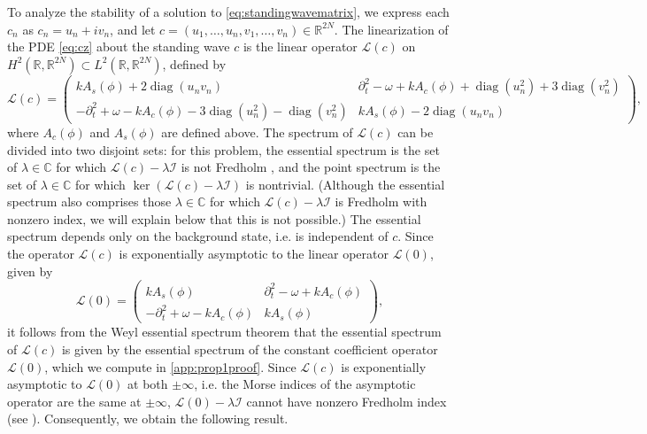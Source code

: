 \documentclass[11pt,reqno]{amsart}
\def\R{{\mathbb R}}
\def\C{{\mathbb C}}
\def\calI{{\mathcal I}}
\def\calL{{\mathcal L}}
\DeclareMathOperator{\diag}{diag}
\begin{document}
To analyze the stability of a solution to \cref{eq:standingwavematrix}, we express each $c_n$ as $c_n = u_n + i v_n$, and let $c = (u_1, \dots, u_n,v_1, \dots, v_n) \in \R^{2N}$. The linearization of the PDE \cref{eq:cz} about the standing wave $c$ is the linear operator $\calL(c)$ on $H^2(\R, \R^{2N}) \subset L^2(\R, \R^{2N})$, defined by 
\begin{equation}\label{eq:linc}
\calL(c) = \begin{pmatrix}
k A_s(\phi) + 2 \diag(u_n v_n) & \partial_t^2 - \omega + k A_c(\phi) + \diag(u_n^2) + 3 \diag(v_n^2) \\
-\partial_t^2 + \omega - k A_c(\phi) - 3\diag(u_n^2) - \diag(v_n^2) &
k A_s(\phi) - 2 \diag(u_n v_n)
\end{pmatrix},
\end{equation}
where $A_c(\phi)$ and $A_s(\phi)$ are defined above. The spectrum of $\calL(c) $ can be divided into two disjoint sets: for this problem, the essential spectrum is the set of $\lambda \in \C$ for which $\calL(c) - \lambda \calI$ is not Fredholm \cite[Section 3.1]{Kapitula2013}, and the point spectrum is the set of $\lambda \in \C$ for which $\ker( \calL(c) - \lambda \calI)$ is nontrivial. (Although the essential spectrum also comprises those $\lambda \in \C$ for which $\calL(c) - \lambda \calI$ is Fredholm with nonzero index, we will explain below that this is not possible.) The essential spectrum depends only on the background state, i.e. is independent of $c$. Since the operator $\calL(c)$ is exponentially asymptotic to the linear operator $\calL(0)$, given by
\begin{equation}\label{eq:L0}
\calL(0) = \begin{pmatrix}
k A_s(\phi) & \partial_t^2 - \omega + k A_c(\phi)  \\
-\partial_t^2 + \omega - k A_c(\phi) &
k A_s(\phi) 
\end{pmatrix},
\end{equation}
it follows from the Weyl essential spectrum theorem \cite[Theorem 2.2.6]{Kapitula2013} that the essential spectrum of $\calL(c)$ is given by the essential spectrum of the constant coefficient operator $\calL(0)$, which we compute in \cref{app:prop1proof}. Since $\calL(c)$ is exponentially asymptotic to $\calL(0)$ at both $\pm \infty$, i.e. the Morse indices of the asymptotic operator are the same at $\pm \infty$, $\calL(0) - \lambda \calI$ cannot have nonzero Fredholm index (see \cite[Lemma 3.1.10]{Kapitula2013}). Consequently, we obtain the following result.
\end{document}
